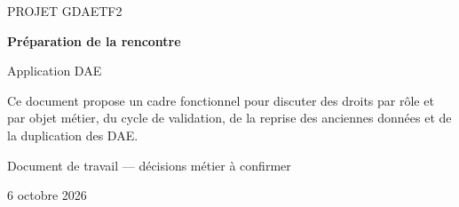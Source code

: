 \documentclass[11pt,a4paper]{article}
\begin{document}
\begin{titlepage}
  \centering
  \vspace*{1.5cm}
  {\Large\textcolor{bleuDAE}{PROJET GDAETF2}\par}
  \vspace{1.2cm}
  {\Huge\bfseries\textcolor{bleuDAE}{Préparation de la rencontre}\par}
  \vspace{0.35cm}
  {\LARGE\textcolor{grisTexteDAE}{Application DAE}\par}
  \vspace{1.2cm}
  \begin{tcolorbox}[
    enhanced,
    colback=bleuClairDAE,
    colframe=bleuDAE,
    boxrule=0.8pt,
    arc=2mm,
    width=0.88\textwidth,
  ]
  Ce document propose un cadre fonctionnel pour discuter des droits par rôle et par objet métier, du cycle de validation, de la reprise des anciennes données et de la duplication des DAE.
  \end{tcolorbox}
  \vfill
  {\large\textcolor{grisTexteDAE}{Document de travail — décisions métier à confirmer}\par}
  \vspace{0.35cm}
  {\small 6 octobre 2026\par}
\end{titlepage}

\tableofcontents
\clearpage



\clearpage

\end{document}
